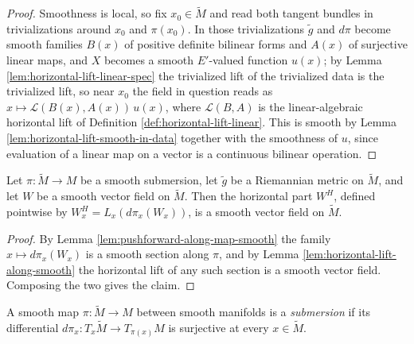 \begin{proof}
\leanok
Smoothness is local, so fix $x_0 \in \tilde{M}$ and read both tangent bundles in trivializations around $x_0$ and $\pi(x_0)$. In those trivializations $\tilde{g}$ and $d\pi$ become smooth families $B(x)$ of positive definite bilinear forms and $A(x)$ of surjective linear maps, and $X$ becomes a smooth $E'$-valued function $u(x)$; by Lemma \ref{lem:horizontal-lift-linear-spec} the trivialized lift of the trivialized data is the trivialized lift, so near $x_0$ the field in question reads as $x \mapsto \mathcal{L}(B(x), A(x))\, u(x)$, where $\mathcal{L}(B,A)$ is the linear-algebraic horizontal lift of Definition \ref{def:horizontal-lift-linear}. This is smooth by Lemma \ref{lem:horizontal-lift-smooth-in-data} together with the smoothness of $u$, since evaluation of a linear map on a vector is a continuous bilinear operation.
\end{proof}

\begin{lemma}
\label{lem:horizontal-projection-field-smooth}
\leanok
{}
Let $\pi : \tilde{M} \to M$ be a smooth submersion, let $\tilde{g}$ be a Riemannian metric on $\tilde{M}$, and let $W$ be a smooth vector field on $\tilde{M}$. Then the horizontal part $W^H$, defined pointwise by $W^H_x = L_x(d\pi_x(W_x))$, is a smooth vector field on $\tilde{M}$.
\end{lemma}

\begin{proof}
\leanok
By Lemma \ref{lem:pushforward-along-map-smooth} the family $x \mapsto d\pi_x(W_x)$ is a smooth section along $\pi$, and by Lemma \ref{lem:horizontal-lift-along-smooth} the horizontal lift of any such section is a smooth vector field. Composing the two gives the claim.
\end{proof}

\begin{definition}
\label{def:submersion}
\leanok
A smooth map $\pi : \tilde{M} \to M$ between smooth manifolds is a \emph{submersion} if its differential $d\pi_x : T_x\tilde{M} \to T_{\pi(x)}M$ is surjective at every $x \in \tilde{M}$.
\end{definition}

